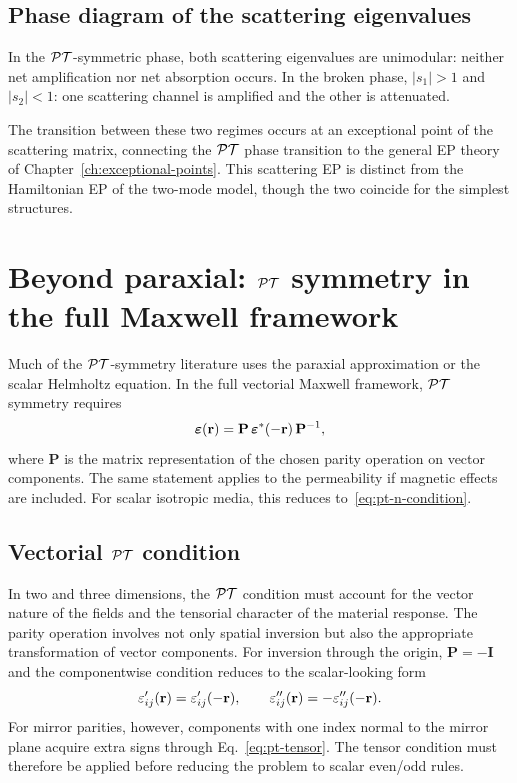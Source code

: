 \subsection{Phase diagram of the scattering eigenvalues}
\label{ssec:pt-scat-phases}

In the $\mathcal{PT}$-symmetric phase, both scattering eigenvalues are
unimodular: neither net amplification nor net absorption occurs. In the
broken phase, $|s_1| > 1$ and $|s_2| < 1$:
one scattering channel is amplified and the other is attenuated.

The transition between these two regimes occurs at an exceptional point
of the scattering matrix, connecting the $\mathcal{PT}$ phase transition to the
general EP theory of Chapter~\ref{ch:exceptional-points}. This
scattering EP is distinct from the Hamiltonian EP of the two-mode model,
though the two coincide for the simplest structures.


\section{Beyond paraxial: $\mathcal{PT}$ symmetry in the full Maxwell framework}
\label{sec:pt-full-maxwell}

Much of the $\mathcal{PT}$-symmetry literature uses the paraxial approximation or
the scalar Helmholtz equation. In the full vectorial Maxwell framework,
$\mathcal{PT}$ symmetry requires
\begin{equation}
 \boldsymbol{\varepsilon}(\mathbf{r})
 = \mathbf{P}\,\boldsymbol{\varepsilon}^*(-\mathbf{r})\,\mathbf{P}^{-1},
 \label{eq:pt-tensor}
\end{equation}
where $\mathbf{P}$ is the matrix representation of the chosen parity
operation on vector components. The same statement applies to the
permeability if magnetic effects are included. For scalar isotropic
media, this reduces to~\eqref{eq:pt-n-condition}.

\subsection{Vectorial $\mathcal{PT}$ condition}
\label{ssec:vectorial-pt}

In two and three dimensions, the $\mathcal{PT}$ condition must account for the
vector nature of the fields and the tensorial character of the material
response. The parity operation involves not only spatial inversion but
also the appropriate transformation of vector components. For inversion
through the origin, $\mathbf{P}=-\mathbf{I}$ and the componentwise
condition reduces to the scalar-looking form
\begin{equation}
 \varepsilon_{ij}'(\mathbf{r}) = \varepsilon_{ij}'(-\mathbf{r}), \qquad
 \varepsilon_{ij}''(\mathbf{r}) = -\varepsilon_{ij}''(-\mathbf{r}).
 \label{eq:pt-tensor-components}
\end{equation}
For mirror parities, however, components with one index normal to the
mirror plane acquire extra signs through
Eq.~\eqref{eq:pt-tensor}. The tensor condition must therefore be applied
before reducing the problem to scalar even/odd rules.

